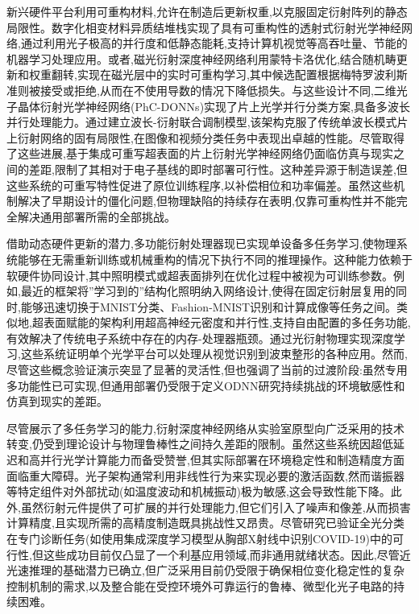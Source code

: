 \documentclass[11pt]{article}
\begin{document}
新兴硬件平台利用可重构材料,允许在制造后更新权重,以克服固定衍射阵列的静态局限性。数字化相变材料异质结堆栈实现了具有可重构性的透射式衍射光学神经网络,通过利用光子极高的并行度和低静态能耗,支持计算机视觉等高吞吐量、节能的机器学习处理应用。或者,磁光衍射深度神经网络利用蒙特卡洛优化,结合随机畴更新和权重翻转,实现在磁光层中的实时可重构学习,其中候选配置根据梅特罗波利斯准则被接受或拒绝,从而在不使用导数的情况下降低损失。与这些设计不同,二维光子晶体衍射光学神经网络(PhC-DONNs)实现了片上光学并行分类方案,具备多波长并行处理能力。通过建立波长-衍射联合调制模型,该架构克服了传统单波长模式片上衍射网络的固有局限性,在图像和视频分类任务中表现出卓越的性能。尽管取得了这些进展,基于集成可重写超表面的片上衍射光学神经网络仍面临仿真与现实之间的差距,限制了其相对于电子基线的即时部署可行性。这种差异源于制造误差,但这些系统的可重写特性促进了原位训练程序,以补偿相位和功率偏差。虽然这些机制解决了早期设计的僵化问题,但物理缺陷的持续存在表明,仅靠可重构性并不能完全解决通用部署所需的全部挑战。\citep{doi_10_1002_adpr_202400201_566e9e2f} \citep{doi_10_1051_jeos_2026026_1bd8ff13} \citep{doi_10_1038_s41598_025_19638_8_1b2db1c9} \citep{doi_10_1515_nanoph_2025_0168_86a0f7aa}

借助动态硬件更新的潜力,多功能衍射处理器现已实现单设备多任务学习,使物理系统能够在无需重新训练或机械重构的情况下执行不同的推理操作。这种能力依赖于软硬件协同设计,其中照明模式或超表面排列在优化过程中被视为可训练参数。例如,最近的框架将''学习到的''结构化照明纳入网络设计,使得在固定衍射层复用的同时,能够迅速切换于MNIST分类、Fashion-MNIST识别和计算成像等任务之间。类似地,超表面赋能的架构利用超高神经元密度和并行性,支持自由配置的多任务功能,有效解决了传统电子系统中存在的内存-处理器瓶颈。通过光衍射物理实现深度学习,这些系统证明单个光学平台可以处理从视觉识别到波束整形的各种应用。然而,尽管这些概念验证演示突显了显著的灵活性,但也强调了当前的过渡阶段:虽然专用多功能性已可实现,但通用部署仍受限于定义ODNN研究持续挑战的环境敏感性和仿真到现实的差距。\citep{doi_10_1364_ol_591818_8738c4b1} \citep{doi_10_1364_prj_576203_ae347fba}

尽管展示了多任务学习的能力,衍射深度神经网络从实验室原型向广泛采用的技术转变,仍受到理论设计与物理鲁棒性之间持久差距的限制。虽然这些系统因超低延迟和高并行光学计算能力而备受赞誉,但其实际部署在环境稳定性和制造精度方面面临重大障碍。光子架构通常利用非线性行为来实现必要的激活函数,然而谐振器等特定组件对外部扰动(如温度波动和机械振动)极为敏感,这会导致性能下降。此外,虽然衍射元件提供了可扩展的并行处理能力,但它们引入了噪声和像差,从而损害计算精度,且实现所需的高精度制造既具挑战性又昂贵。尽管研究已验证全光分类在专门诊断任务(如使用集成深度学习模型从胸部X射线中识别COVID-19)中的可行性,但这些成功目前仅凸显了一个利基应用领域,而非通用就绪状态。因此,尽管近光速推理的基础潜力已确立,但广泛采用目前仍受限于确保相位变化稳定性的复杂控制机制的需求,以及整合能在受控环境外可靠运行的鲁棒、微型化光子电路的持续困难。\citep{doi_10_3390_nano14080697_c372a140} \citep{doi_10_3390_app122010535_b538921c} \citep{doi_10_1364_josab_497148_b087424b}
\end{document}
